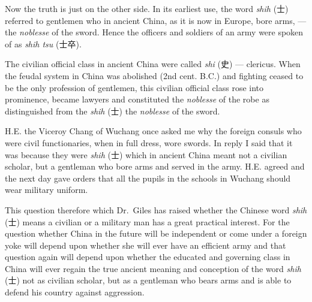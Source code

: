 Now the truth is just on the other side.
In its earliest use, the word \emph{shih} (士) referred to gentlemen who in ancient China, as it is now in Europe, bore arms, --- the \emph{noblesse} of the sword.
Hence the officers and soldiers of an army were spoken of as \emph{shih tsu} (士卒).

The civilian official class in ancient China were called \emph{shi} (史) --- clericus.
When the feudal system in China was abolished (2nd cent. B.C.) and fighting ceased to be the only profession of gentlemen, this civilian official class rose into prominence, became lawyers and constituted the \emph{noblesse} of the robe as distinguished from the \emph{shih} (士) the \emph{noblesse} of the sword.

H.E. the Viceroy Chang of Wuchang once asked me why the foreign consuls who were civil functionaries, when in full dress, wore swords.
In reply I said that it was because they were \emph{shih} (士) which in ancient China meant not a civilian scholar, but a gentleman who bore arms and served in the army.
H.E. agreed and the next day gave orders that all the pupils in the schools in Wuchang should wear military uniform.

This question therefore which Dr.~Giles has raised whether the Chinese word \emph{shih} (士) means a civilian or a military man has a great practical interest.
For the question whether China in the future will be independent or come under a foreign yoke will depend upon whether she will ever have an efficient army and that question again will depend upon whether the educated and governing class in China will ever regain the true ancient meaning and conception of the word \emph{shih} (士) not as civilian scholar, but as a gentleman who bears arms and is able to defend his country against aggression. 


